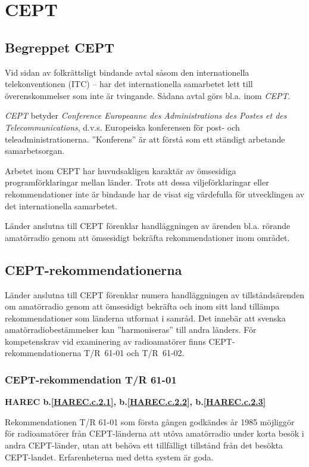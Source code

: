 
\section{CEPT}

\subsection{Begreppet CEPT}

Vid sidan av folkrättsligt bindande avtal såsom den internationella
telekonventionen (ITC) -- har det internationella samarbetet lett till
överenskommelser som inte är tvingande. Sådana avtal görs bl.a. inom
\emph{CEPT}.

\emph{CEPT} betyder \emph{Conference Europeanne des Administrations
  des Postes et des Telecommunications}, d.v.s. Europeiska konferensen
för post- och teleadministrationerna. ''Konferens'' är att förstå som
ett ständigt arbetande samarbetsorgan.

Arbetet inom CEPT har huvudsakligen karaktär av ömsesidiga
programförklaringar mellan länder. Trots att dessa viljeförklaringar
eller rekommendationer inte är bindande har de visat sig värdefulla
för utvecklingen av det internationella samarbetet.

Länder anslutna till CEPT förenklar handläggningen av ärenden
bl.a. rörande amatörradio genom att ömsesidigt bekräfta
rekommendationer inom området.

\subsection{CEPT-rekommendationerna}

Länder anslutna till CEPT förenklar numera handläggningen av
tillståndsärenden om amatörradio genom att ömsesidigt bekräfta och
inom sitt land tillämpa rekommendationer som länderna utformat i
samråd. Det innebär att svenska amatörradiobestämmelser kan
''harmoniseras'' till andra länders.  För kompetenskrav vid
examinering av radioamatörer finns CEPT-rekommendationerna T/R~61-01
och T/R~61-02.

\subsubsection{CEPT-rekommendation T/R 61-01}
\textbf{
HAREC b.\ref{HAREC.c.2.1}\label{myHAREC.c.2.1},
 b.\ref{HAREC.c.2.2}\label{myHAREC.c.2.2},
 b.\ref{HAREC.c.2.3}\label{myHAREC.c.2.3}
}

Rekommendationen T/R 61-01 som första gången godkändes år 1985 möjliggör för
radioamatörer från CEPT-länderna att utöva amatörradio under korta besök i
andra CEPT-länder, utan att behöva ett tillfälligt tillstånd från det besökta
CEPT-landet. Erfarenheterna med detta system är goda.

